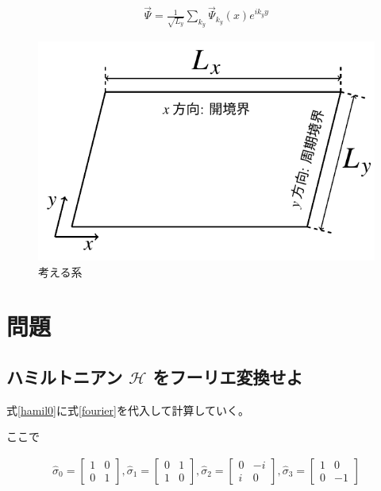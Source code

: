 \documentclass{jsarticle}
\begin{document}
            \begin{align}
                \vec{\Psi}=\frac{1}{\sqrt{L_y}}\sum_{k_y} \vec{\Psi}_{k_y}(x) e^{ik_yy}
                \label{fourier}
            \end{align}
    
            \begin{figure}[H]
                \centering
                \includegraphics[scale=1]{figure1}
                \caption{考える系}
                \label{system}
            \end{figure}
    
        \section{問題}
            \subsection{ハミルトニアン $\mathcal{H}$ をフーリエ変換せよ}
            式\eqref{hamil0}に式\eqref{fourier}を代入して計算していく。

            ここで
    
            \begin{align}
                \hat{\sigma}_0=
                \begin{bmatrix}
                    1 & 0 \\
                    0 & 1
                \end{bmatrix},
                \hat{\sigma}_1=
                \begin{bmatrix}
                    0 & 1 \\
                    1 & 0
                \end{bmatrix},
                \hat{\sigma}_2=
                \begin{bmatrix}
                    0 & -i \\
                    i & 0
                \end{bmatrix} ,
                \hat{\sigma}_3=
                \begin{bmatrix}
                    1 & 0 \\
                    0 & -1
                \end{bmatrix}
            \end{align}
\end{document}

